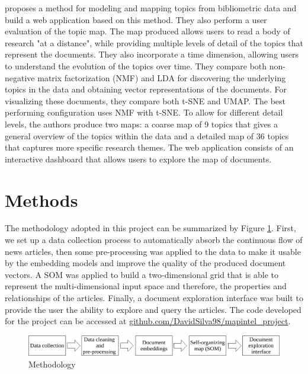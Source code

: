 \documentclass[a4paper]{article}
\begin{document}
\citep{lafia2021a} proposes a method for modeling and mapping topics from bibliometric data and build a web application based on this method. They also perform a user evaluation of the topic map. The map produced allows users to read a body of research "at a distance", while providing multiple levels of detail of the topics that represent the documents. They also incorporate a time dimension, allowing users to understand the evolution of the topics over time. They compare both non-negative matrix factorization (NMF) \citep{lee1999} and LDA for discovering the underlying topics in the data and obtaining vector representations of the documents. For visualizing these documents, they compare both t-SNE and UMAP. The best performing configuration uses NMF with t-SNE. To allow for different detail levels, the authors produce two maps: a coarse map of 9 topics that gives a general overview of the topics within the data and a detailed map of 36 topics that captures more specific research themes. The web application consists of an interactive dashboard that allows users to explore the map of documents.

\section*{Methods}
The methodology adopted in this project can be summarized by Figure \ref{Methodology}. First, we set up a data collection process to automatically absorb the continuous flow of news articles, then some pre-processing was applied to the data to make it usable by the embedding models and improve the quality of the produced document vectors. A SOM was applied to build a two-dimensional grid that is able to represent the multi-dimensional input space and therefore, the properties and relationships of the articles. Finally, a document exploration interface was built to provide the user the ability to explore and query the articles. The code developed for the project can be accessed at \href{https://github.com/DavidSilva98/mapintel_project}{github.com/DavidSilva98/mapintel\_project}.
\begin{figure}[H]
	\centering
	\includegraphics[scale=0.7]{./figures/methodology}
	\caption{Methodology}
	\label{Methodology}
\end{figure}
\end{document}

